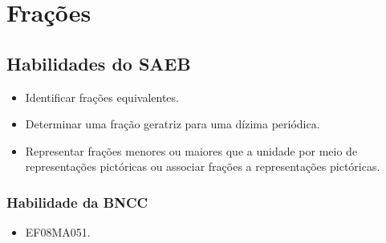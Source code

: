 \chapter{Frações}

\section*{Habilidades do SAEB}

\begin{itemize}
\item
    Identificar frações equivalentes.
\item
    Determinar uma fração geratriz para uma dízima periódica.
\item
    Representar frações menores ou maiores que a
    unidade por meio de representações pictóricas ou associar frações a
    representações pictóricas.
\end{itemize}

\subsection{Habilidade da BNCC}

\begin{itemize}
  \item EF08MA051.
\end{itemize}

